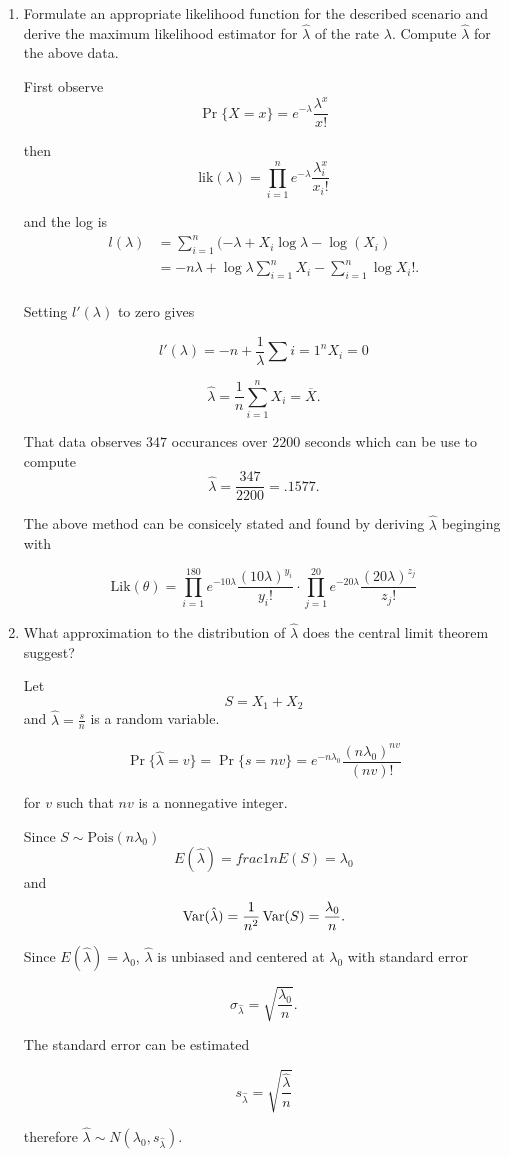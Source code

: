 \documentclass{tufte-book}
\begin{document}
\begin{enumerate}

\item Formulate an appropriate likelihood function for the described scenario and derive the maximum likelihood estimator for $\hat{\lambda}$ of the rate $\lambda$.  Compute $\hat{\lambda}$ for the above data.

First observe
\[ \Pr\{X=x\} = e^{-\lambda} \frac{\lambda^x}{x!} \]

then
\[ \text{lik}(\lambda) = \prod_{i=1}^n e^{-\lambda} \frac{\lambda^x_i}{x_i!}  \]

and the log is
\begin{align*}
l(\lambda) &= \sum_{i=1}^n(-\lambda + X_i\log \lambda - \log(X_i) \\
&= -n\lambda + \log\lambda \sum_{i=1}^n X_i - \sum_{i=1}^n \log X_i!.\\
\end{align*}

Setting $l'(\lambda)$ to zero gives

\[l'(\lambda) = -n + \frac{1}{\lambda}\sum{i=1}^n X_i = 0 \]

\[ \hat{\lambda} = \frac{1}{n}\sum_{i=1}^n X_i = \overline{X}. \]

That data observes $347$ occurances over $2200$ seconds which can be use to compute
\[ \hat{\lambda} = \frac{347}{2200} = .1577. \]

The above method can be consicely stated and found by deriving $\hat{\lambda}$ beginging with

\[ \text{Lik}(\theta) = \prod_{i=1}^{180} e^{-10\lambda} \frac{(10\lambda)^{y_i}}{y_i!} \cdot \prod_{j=1}^{20} e^{-20\lambda} \frac{(20\lambda)^{z_j}}{z_j!} \]

\item What approximation to the distribution of $\hat{\lambda}$ does the central limit theorem suggest?

Let
\[ S=X_1 + X_2 \]
and $\hat{\lambda}=\frac{s}{n}$ is a random variable.

\[ \Pr\{\hat{\lambda}=v \} = \Pr\{ s=nv \} = e^{-n\lambda_0}\frac{(n\lambda_0)^{nv}}{(nv)!} \]

for $v$ such that $nv$ is a nonnegative integer.

Since $S \sim \text{Pois}(n\lambda_0)$
\[ E(\hat{\lambda}) = frac{1}{n}E(S) = \lambda_0 \]
and
\[ \operatorname{Var}(\hat{\lambda}) = \frac{1}{n^2} \operatorname{Var}(S) = \frac{\lambda_0}{n}.\]

Since $E(\hat{\lambda}) = \lambda_0$, $\hat{\lambda}$ is unbiased and centered at $\lambda_0$ with standard error

\[ \sigma_{\hat{\lambda}} = \sqrt{\frac{\lambda_0}{n}}.\]

The standard error can be estimated

\[ s_{\hat{\lambda}} = \sqrt{\frac{\hat{\lambda}}{n}} \]

therefore $\hat{\lambda} \sim N(\lambda_0, s_{\hat{\lambda}})$.
\end{enumerate}
\end{document}
